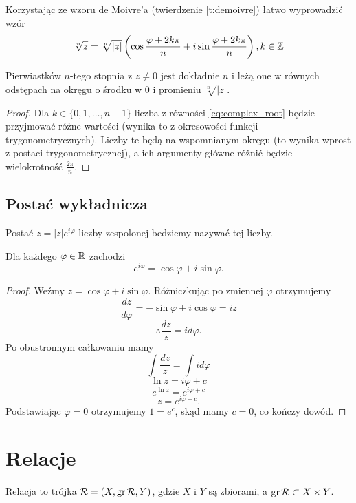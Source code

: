 \documentclass[11pt]{scrartcl}
\begin{document}
    Korzystając ze wzoru de Moivre'a (twierdzenie \ref{t:demoivre}) łatwo wyprowadzić wzór
    \begin{equation}
        \label{eq:complex_root}
        \sqrt[n]{z} = \sqrt[n]{|z|}\left(\cos\frac{\varphi + 2k\pi}{n} + i\sin\frac{\varphi + 2k\pi}{n}\right), k \in \mathbb Z
    \end{equation}

    \begin{fact}
        Pierwiastków $n$-tego stopnia z $z \neq 0$ jest dokładnie $n$ i leżą one w równych odstępach na okręgu o środku w $0$ i promieniu $\sqrt[n]{|z|}$.
    \end{fact}
    \begin{proof}
        Dla $k \in \{0, 1, \ldots, n-1\}$ liczba z równości \ref{eq:complex_root} będzie przyjmować różne wartości (wynika to z okresowości funkcji trygonometrycznych). Liczby te będą na wspomnianym okręgu (to wynika wprost z postaci trygonometrycznej), a ich argumenty główne różnić będzie wielokrotność $\frac{2\pi}{n}$.
    \end{proof}

    \subsection{Postać wykładnicza}
    Postać $z = |z|e^{i\varphi}$ liczby zespolonej bedziemy nazywać  tej liczby.
    \begin{theorem}
        Dla każdego $\varphi \in \mathbb R$ zachodzi
        $$ e^{i\varphi} = \cos\varphi + i\sin\varphi. $$
    \end{theorem}
    \begin{proof}
        Weźmy $z = \cos\varphi + i\sin\varphi$. Różniczkując po zmiennej $\varphi$ otrzymujemy
        $$ \frac{dz}{d\varphi} = -\sin\varphi + i\cos\varphi = iz $$
        $$ \therefore \frac{dz}{z} = id\varphi. $$
        Po obustronnym całkowaniu mamy
        $$ \int\frac{dz}{z} = \int id\varphi $$
        $$ \ln{z} = i\varphi + c $$
        $$ e^{\ln{z}} = e^{i\varphi + c} $$
        $$ z = e^{i\varphi + c}. $$
        Podstawiając $\varphi = 0$ otrzymujemy $1 = e^c$, skąd mamy $c = 0$, co kończy dowód.
    \end{proof}

    \section{Relacje}
    \begin{definition}
        Relacja to trójka $\mathcal R = (X, \operatorname{gr}\mathcal R, Y)$, gdzie $X$ i $Y$ są zbiorami, a $\operatorname{gr} \mathcal R \subset X \times Y$.
    \end{definition}
\end{document}
